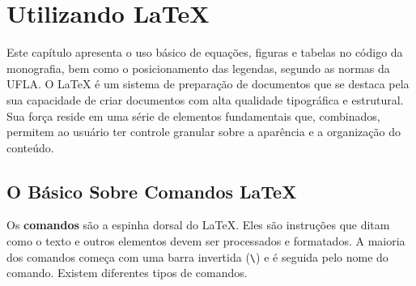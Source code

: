 \chapter{Utilizando \LaTeX}\label{sec:latex}

Este capítulo apresenta o uso básico de equações, figuras e tabelas no código da monografia, bem como o posicionamento das legendas, segundo as normas da UFLA. O LaTeX é um sistema de preparação de documentos que se destaca pela sua capacidade de criar documentos com alta qualidade tipográfica e estrutural. Sua força reside em uma série de elementos fundamentais que, combinados, permitem ao usuário ter controle granular sobre a aparência e a organização do conteúdo.


\section{O Básico Sobre Comandos \LaTeX}

Os \textbf{comandos} são a espinha dorsal do LaTeX. Eles são instruções que ditam como o texto e outros elementos devem ser processados e formatados. A maioria dos comandos começa com uma barra invertida (\verb|\|) e é seguida pelo nome do comando. Existem diferentes tipos de comandos.

